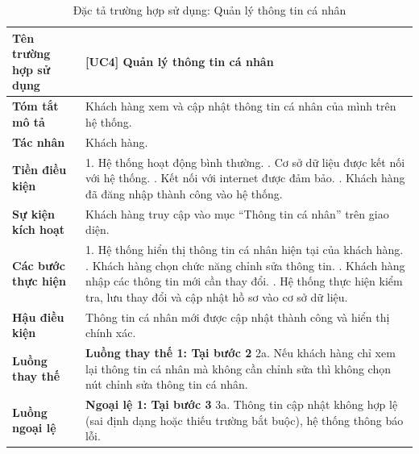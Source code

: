 \begin{longtable}{|>{\bfseries}p{4cm}|p{11.5cm}|}
\caption{Đặc tả trường hợp sử dụng: Quản lý thông tin cá nhân}
\label{tab:uc-profile-management} \\
\hline
\textbf{Tên trường hợp sử dụng} & [UC4] Quản lý thông tin cá nhân \\
\hline
\textbf{Tóm tắt mô tả} & Khách hàng xem và cập nhật thông tin cá nhân của mình trên hệ thống. \\
\hline
\textbf{Tác nhân} & Khách hàng. \\
\hline
\textbf{Tiền điều kiện} & 1. Hệ thống hoạt động bình thường. \newline
2. Cơ sở dữ liệu được kết nối với hệ thống. \newline
3. Kết nối với internet được đảm bảo. \newline
4. Khách hàng đã đăng nhập thành công vào hệ thống. \\
\hline
\textbf{Sự kiện kích hoạt} & Khách hàng truy cập vào mục “Thông tin cá nhân” trên giao diện. \\
\hline
\textbf{Các bước thực hiện} & 1. Hệ thống hiển thị thông tin cá nhân hiện tại của khách hàng. \newline
2. Khách hàng chọn chức năng chỉnh sửa thông tin. \newline
3. Khách hàng nhập các thông tin mới cần thay đổi. \newline
4. Hệ thống thực hiện kiểm tra, lưu thay đổi và cập nhật hồ sơ vào cơ sở dữ liệu. \\
\hline
\textbf{Hậu điều kiện} & Thông tin cá nhân mới được cập nhật thành công và hiển thị chính xác. \\
\hline
\textbf{Luồng thay thế} & \textbf{Luồng thay thế 1: Tại bước 2} \newline
2a. Nếu khách hàng chỉ xem lại thông tin cá nhân mà không cần chỉnh sửa thì không chọn nút chỉnh sửa thông tin cá nhân. \\
\hline
\textbf{Luồng ngoại lệ} & \textbf{Ngoại lệ 1: Tại bước 3} \newline
3a. Thông tin cập nhật không hợp lệ (sai định dạng hoặc thiếu trường bắt buộc), hệ thống thông báo lỗi. \\
\hline
\end{longtable}

